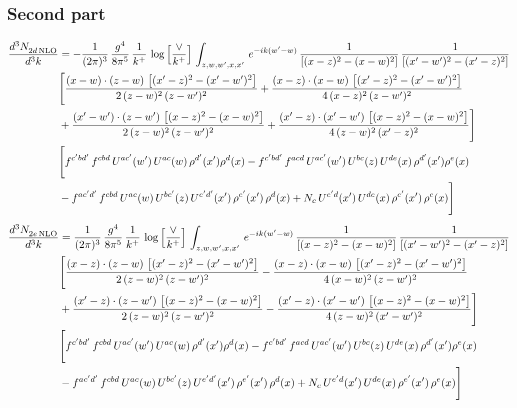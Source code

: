 \documentclass[9pt]{article}
\numberwithin{equation}{section}
\begin{document}
\subsubsection{Second part}
\begin{align}
 \frac{d^{3}N_{2d\,\rm NLO}^{\rm}}{d^{3}k}  & = -\frac{1}{(2\pi)^{3}}\, \frac{g^{4}}{8\pi^{5}}\,\frac{1}{k^{+}}\,\log{\left[\frac{\vee}{k^{+}}\right]}\,\int_{z,w,w^{\prime},x,x'}\, e^{-ik(w^{\prime}-w)}\,\frac{1}{\left[(x-z)^{2}-(x-w)^{2}\right]}\, \frac{1}{\left[(x'-w')^{2}-(x'-z)^{2}\right]}\notag \\ & \Bigg[\frac{(x-w)\cdot (z-w)\, \left[(x'-z)^{2}-(x'-w')^{2}\right]}{2\, (z-w)^{2}\, (z-w')^{2}}  + \frac{(x-z)\cdot (x-w)\,\left[(x'-z)^{2}-(x'-w')^{2}\right] }{4\,(x-z)^{2}\,(z-w')^{2}}\notag \\ & +\frac{(x'-w')\cdot (z-w')\, \left[(x-z)^{2}-(x-w)^{2}\right]}{2\, (z-w)^{2}\, (z-w')^{2}}+ \frac{(x'-z)\cdot (x'-w')\, \left[(x-z)^{2}-(x-w)^{2}\right]}{4\, (z-w)^{2}\,(x'-z)^{2}}\Bigg] \notag \\ &  \Bigg[f^{c'bd'}\,f^{cbd}\, U^{ac'}(w')\,U^{ac}(w)\,\rho^{d'}(x')\rho^{d}(x)- f^{c'bd'}\,f^{acd}\,U^{ac'}(w')\,U^{bc}(z)\,U^{de}(x)\,\rho^{d'}(x')\rho^{e}(x) \notag \\ & -f^{ac'd'}\,f^{cbd}\,U^{ac}(w)\,U^{bc'}(z)\,U^{e'd'}(x')\,\rho^{e'}(x')\,\rho^{d}(x) +N_{c}\,U^{e'd}(x')\,U^{de}(x)\,\rho^{e'}(x')\,\rho^{e}(x)\Bigg]
\end{align}
\begin{align}
 \frac{d^{3}N_{2e\,\rm NLO}^{\rm}}{d^{3}k}  & = \frac{1}{(2\pi)^{3}}\, \frac{g^{4}}{8\pi^{5}}\,\frac{1}{k^{+}}\,\log{\left[\frac{\vee}{k^{+}}\right]}\,\int_{z,w,w^{\prime},x,x'}\, e^{-ik(w^{\prime}-w)}\, \frac{1}{\left[(x-z)^{2}-(x-w)^{2}\right]}\, \frac{1}{\left[(x'-w')^{2} - (x'-z)^{2}\right]} \notag \\ & \Bigg[\frac{(x-z)\cdot (z-w)\, \left[(x'-z)^{2}-(x'-w')^{2}\right]}{2\, (z-w)^{2}\, (z-w')^{2}}  - \frac{(x-z)\cdot (x-w)\,\left[(x'-z)^{2}-(x'-w')^{2}\right] }{4\,(x-w)^{2}\,(z-w')^{2}}\notag \\ & +\frac{(x'-z)\cdot (z-w')\, \left[(x-z)^{2}-(x-w)^{2}\right]}{2\, (z-w)^{2}\, (z-w')^{2}}-\frac{(x'-z)\cdot (x'-w')\, \left[(x-z)^{2}-(x-w)^{2}\right]}{4\, (z-w)^{2}\,(x'-w')^{2}}\Bigg]\notag \\ & \Bigg[f^{c'bd'}\,f^{cbd}\, U^{ac'}(w')\,U^{ac}(w)\,\rho^{d'}(x')\rho^{d}(x)- f^{c'bd'}\,f^{acd}\,U^{ac'}(w')\,U^{bc}(z)\,U^{de}(x)\,\rho^{d'}(x')\rho^{e}(x) \notag \\ & -f^{ac'd'}\,f^{cbd}\,U^{ac}(w)\,U^{bc'}(z)\,U^{e'd'}(x')\,\rho^{e'}(x')\,\rho^{d}(x) +N_{c}\,U^{e'd}(x')\,U^{de}(x)\,\rho^{e'}(x')\,\rho^{e}(x)\Bigg]
\end{align}
\end{document}
